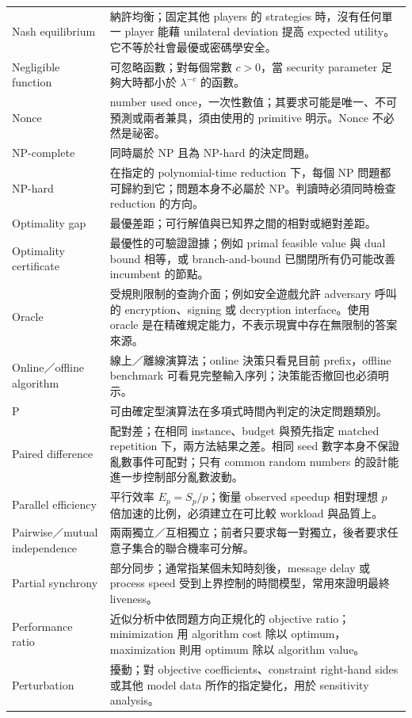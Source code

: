 \documentclass[11pt,a4paper,oneside,openany]{book}
\begin{document}
\begin{longtable}{@{}>{\raggedright\arraybackslash}p{}p{}@{}}
Nash equilibrium & 納許均衡；固定其他 players 的 strategies 時，沒有任何單一 player 能藉 unilateral deviation 提高 expected utility。它不等於社會最優或密碼學安全。 \\
Negligible function & 可忽略函數；對每個常數 $c>0$，當 security parameter 足夠大時都小於 $\lambda^{-c}$ 的函數。 \\
Nonce & number used once，一次性數值；其要求可能是唯一、不可預測或兩者兼具，須由使用的 primitive 明示。Nonce 不必然是祕密。 \\
NP-complete & 同時屬於 NP 且為 NP-hard 的決定問題。 \\
NP-hard & 在指定的 polynomial-time reduction 下，每個 NP 問題都可歸約到它；問題本身不必屬於 NP。判讀時必須同時檢查 reduction 的方向。 \\
Optimality gap & 最優差距；可行解值與已知界之間的相對或絕對差距。 \\
Optimality certificate & 最優性的可驗證證據；例如 primal feasible value 與 dual bound 相等，或 branch-and-bound 已關閉所有仍可能改善 incumbent 的節點。 \\
Oracle & 受規則限制的查詢介面；例如安全遊戲允許 adversary 呼叫的 encryption、signing 或 decryption interface。使用 oracle 是在精確規定能力，不表示現實中存在無限制的答案來源。 \\
Online／offline algorithm & 線上／離線演算法；online 決策只看見目前 prefix，offline benchmark 可看見完整輸入序列；決策能否撤回也必須明示。 \\
P & 可由確定型演算法在多項式時間內判定的決定問題類別。 \\
Paired difference & 配對差；在相同 instance、budget 與預先指定 matched repetition 下，兩方法結果之差。相同 seed 數字本身不保證亂數事件可配對；只有 common random numbers 的設計能進一步控制部分亂數波動。 \\
Parallel efficiency & 平行效率 $E_p=S_p/p$；衡量 observed speedup 相對理想 $p$ 倍加速的比例，必須建立在可比較 workload 與品質上。 \\
Pairwise／mutual independence & 兩兩獨立／互相獨立；前者只要求每一對獨立，後者要求任意子集合的聯合機率可分解。 \\
Partial synchrony & 部分同步；通常指某個未知時刻後，message delay 或 process speed 受到上界控制的時間模型，常用來證明最終 liveness。 \\
Performance ratio & 近似分析中依問題方向正規化的 objective ratio；minimization 用 algorithm cost 除以 optimum，maximization 則用 optimum 除以 algorithm value。 \\
Perturbation & 擾動；對 objective coefficients、constraint right-hand sides 或其他 model data 所作的指定變化，用於 sensitivity analysis。 \\

\end{longtable}
\end{document}
